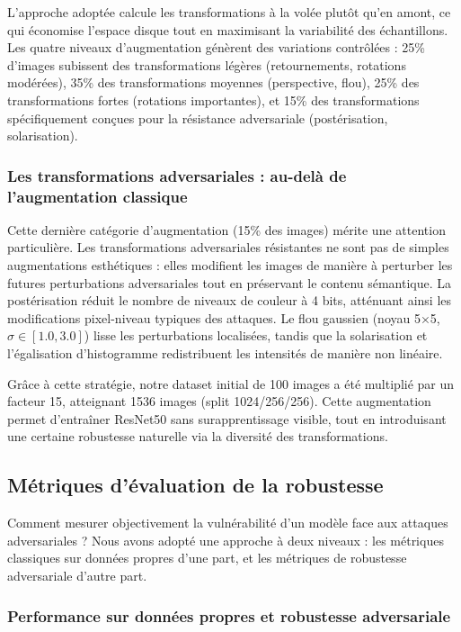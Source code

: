 L'approche adoptée calcule les transformations à la volée plutôt qu'en amont, ce qui économise l'espace disque tout en maximisant la variabilité des échantillons. Les quatre niveaux d'augmentation génèrent des variations contrôlées : 25\% d'images subissent des transformations légères (retournements, rotations modérées), 35\% des transformations moyennes (perspective, flou), 25\% des transformations fortes (rotations importantes), et 15\% des transformations spécifiquement conçues pour la résistance adversariale (postérisation, solarisation).

\subsubsection{Les transformations adversariales : au-delà de l'augmentation classique}

Cette dernière catégorie d'augmentation (15\% des images) mérite une attention particulière. Les transformations adversariales résistantes ne sont pas de simples augmentations esthétiques : elles modifient les images de manière à perturber les futures perturbations adversariales tout en préservant le contenu sémantique. La postérisation réduit le nombre de niveaux de couleur à 4 bits, atténuant ainsi les modifications pixel-niveau typiques des attaques. Le flou gaussien (noyau 5×5, $\sigma \in [1.0, 3.0]$) lisse les perturbations localisées, tandis que la solarisation et l'égalisation d'histogramme redistribuent les intensités de manière non linéaire.

Grâce à cette stratégie, notre dataset initial de 100 images a été multiplié par un facteur 15, atteignant 1536 images (split 1024/256/256). Cette augmentation permet d'entraîner ResNet50 sans surapprentissage visible, tout en introduisant une certaine robustesse naturelle via la diversité des transformations.

\subsection{Métriques d'évaluation de la robustesse}

Comment mesurer objectivement la vulnérabilité d'un modèle face aux attaques adversariales ? Nous avons adopté une approche à deux niveaux : les métriques classiques sur données propres d'une part, et les métriques de robustesse adversariale d'autre part.

\subsubsection{Performance sur données propres et robustesse adversariale}

